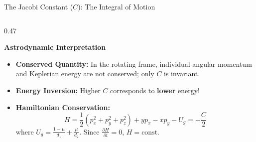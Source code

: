 \documentclass[aspectratio=169, 10pt]{beamer}
\begin{document}
\begin{frame}{The Jacobi Constant ($C$): The Integral of Motion}
\begin{columns}[t]
        \begin{column}{0.47\textwidth}
            \begin{block}{\textbf{Astrodynamic Interpretation}}
                \scriptsize
                \begin{itemize}\setlength{\itemsep}{2pt}
                    \item \textbf{Conserved Quantity:} In the rotating frame, individual angular momentum and Keplerian energy are not conserved; only $C$ is invariant.
                    \item \textbf{Energy Inversion:} Higher $C$ corresponds to \textbf{lower} energy!
                    \item \textbf{Hamiltonian Conservation:}
                    \begin{equation*}
                        H = \frac{1}{2}(p_x^2 + p_y^2 + p_z^2) + y p_x - x p_y - U_g = -\frac{C}{2}
                    \end{equation*}
                    where $U_g = \frac{1-\mu}{d_1} + \frac{\mu}{d_2}$. Since $\frac{\partial H}{\partial t} = 0$, $H = \text{const}$.
                \end{itemize}
            \end{block}
        \end{column}
    \end{columns}
\end{frame}
\end{document}
